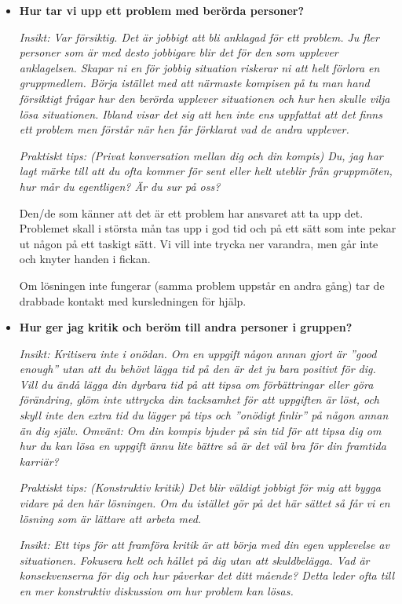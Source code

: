 \documentclass{mall}
\begin{document}
\begin{itemize}
\item \textbf{Hur tar vi upp ett problem med berörda personer?}

  \emph{Insikt: Var försiktig. Det är jobbigt att bli anklagad för ett problem. Ju fler personer som är
  med desto jobbigare blir det för den som upplever anklagelsen. Skapar ni en för jobbig situation
  riskerar ni att helt förlora en gruppmedlem. Börja istället med att närmaste kompisen på tu man
  hand försiktigt frågar hur den berörda upplever situationen och hur hen skulle vilja lösa
  situationen. Ibland visar det sig att hen inte ens uppfattat att det finns ett problem men förstår
  när hen får förklarat vad de andra upplever.}
  
 \emph{Praktiskt tips: (Privat konversation mellan dig och din kompis) Du, jag har lagt märke till att du
  ofta kommer för sent eller helt uteblir från gruppmöten, hur mår du egentligen? Är du sur på oss?}

 Den/de som känner att det är ett problem har ansvaret att ta upp det. Problemet skall i största mån tas
 upp i god tid och på ett sätt som inte pekar ut någon på ett taskigt sätt. Vi vill inte trycka ner varandra,
 men går inte och knyter handen i fickan.

 Om lösningen inte fungerar (samma problem uppstår en andra gång) tar de drabbade kontakt med kursledningen för hjälp.

\item \textbf{Hur ger jag kritik och beröm till andra personer i gruppen?}

  \emph{Insikt: Kritisera inte i onödan. Om en uppgift någon annan gjort är ''good enough'' utan att du behövt lägga tid på
  den är det ju bara positivt för dig. Vill du ändå lägga din dyrbara tid på att tipsa om
  förbättringar eller göra förändring, glöm inte uttrycka din tacksamhet för att uppgiften är löst, och skyll inte den
  extra tid du lägger på tips och ''onödigt finlir'' på någon annan än dig själv.  Omvänt: Om din
  kompis bjuder på sin tid för att tipsa dig om hur du kan lösa en uppgift ännu lite bättre så är
  det väl bra för din framtida karriär?}
  
  \emph{Praktiskt tips: (Konstruktiv kritik) Det blir väldigt jobbigt för mig att bygga vidare på den här lösningen. Om du istället gör på det
    här sättet så får vi en lösning som är lättare att arbeta med.}
  
  \emph{Insikt: Ett tips för att framföra kritik är att börja med din egen upplevelse av situationen. Fokusera helt och hållet på dig utan att skuldbelägga. Vad är konsekvenserna för dig och hur påverkar det ditt mående? Detta leder ofta till en mer konstruktiv diskussion om hur problem kan lösas.}


\end{itemize}
\end{document}
